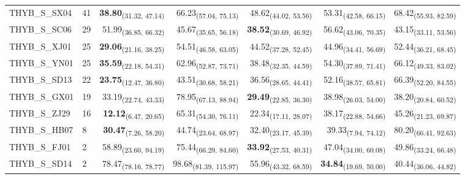 \begin{table}[p]
\begin{tabular}{llrrrrr}
THYB\_S\_SX04 & 41 & \textbf{38.80}\textsubscript{(31.32, 47.14)} & 66.23\textsubscript{(57.04, 75.13)} & 48.62\textsubscript{(44.02, 53.56)} & 53.31\textsubscript{(42.58, 66.15)} & 68.42\textsubscript{(55.93, 82.59)} \\
THYB\_S\_SC06 & 29 & 51.99\textsubscript{(36.85, 66.32)} & 45.67\textsubscript{(35.65, 56.18)} & \textbf{38.52}\textsubscript{(30.69, 46.92)} & 56.62\textsubscript{(43.06, 70.35)} & 43.15\textsubscript{(33.11, 53.56)} \\
THYB\_S\_XJ01 & 25 & \textbf{29.06}\textsubscript{(21.16, 38.25)} & 54.51\textsubscript{(46.58, 63.05)} & 44.52\textsubscript{(37.28, 52.45)} & 44.96\textsubscript{(34.41, 56.69)} & 52.44\textsubscript{(36.21, 68.45)} \\
THYB\_S\_YN01 & 25 & \textbf{35.59}\textsubscript{(22.18, 54.31)} & 62.96\textsubscript{(52.87, 73.71)} & 38.48\textsubscript{(32.35, 44.59)} & 54.30\textsubscript{(37.89, 71.41)} & 66.12\textsubscript{(49.33, 83.02)} \\
THYB\_S\_SD13 & 22 & \textbf{23.75}\textsubscript{(12.47, 36.80)} & 43.51\textsubscript{(30.68, 58.21)} & 36.56\textsubscript{(28.65, 44.41)} & 52.16\textsubscript{(38.57, 65.81)} & 66.39\textsubscript{(52.20, 84.55)} \\
THYB\_S\_GX01 & 19 & 33.19\textsubscript{(22.74, 43.33)} & 78.95\textsubscript{(67.13, 88.94)} & \textbf{29.49}\textsubscript{(22.85, 36.30)} & 38.98\textsubscript{(26.03, 54.00)} & 38.20\textsubscript{(20.84, 60.52)} \\
THYB\_S\_ZJ29 & 16 & \textbf{12.12}\textsubscript{(6.47, 20.65)} & 65.31\textsubscript{(54.30, 76.11)} & 22.34\textsubscript{(17.11, 28.07)} & 38.17\textsubscript{(22.88, 54.66)} & 45.26\textsubscript{(21.23, 69.87)} \\
THYB\_S\_HB07 & 8 & \textbf{30.47}\textsubscript{(7.26, 58.20)} & 44.74\textsubscript{(23.64, 68.97)} & 32.40\textsubscript{(23.17, 45.39)} & 39.33\textsubscript{(7.94, 74.12)} & 80.20\textsubscript{(66.41, 92.63)} \\
THYB\_S\_FJ01 & 2 & 58.89\textsubscript{(23.60, 94.19)} & 75.44\textsubscript{(66.29, 84.60)} & \textbf{33.92}\textsubscript{(27.53, 40.31)} & 47.04\textsubscript{(34.00, 60.08)} & 49.86\textsubscript{(33.24, 66.48)} \\
THYB\_S\_SD14 & 2 & 78.47\textsubscript{(78.16, 78.77)} & 98.68\textsubscript{(81.39, 115.97)} & 55.96\textsubscript{(43.32, 68.59)} & \textbf{34.84}\textsubscript{(19.69, 50.00)} & 40.44\textsubscript{(36.06, 44.82)} \\
\bottomrule
\end{tabular}
\end{table}
\clearpage
